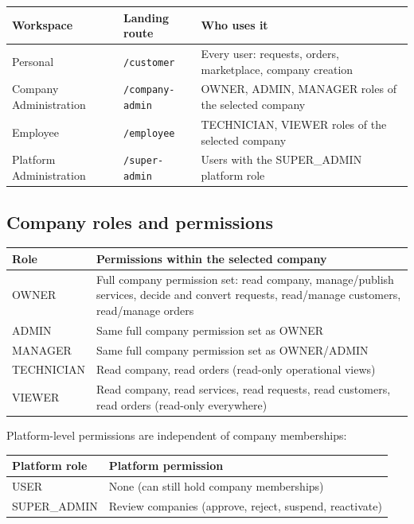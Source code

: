 \documentclass[11pt,a4paper]{article}
\begin{document}
\begin{longtable}{@{}L{3.6cm}L{3.6cm}L{7.6cm}@{}}
  \toprule
  \textbf{Workspace} & \textbf{Landing route} & \textbf{Who uses it} \\
  \midrule
  \endhead
  Personal & \texttt{/customer} & Every user: requests, orders, marketplace, company creation \\
  Company Administration & \texttt{/company-admin} & OWNER, ADMIN, MANAGER roles of the selected company \\
  Employee & \texttt{/employee} & TECHNICIAN, VIEWER roles of the selected company \\
  Platform Administration & \texttt{/super-admin} & Users with the SUPER\_ADMIN platform role \\
  \bottomrule
\end{longtable}

\subsection{Company roles and permissions}
\label{sec:permissions}

\begin{longtable}{@{}L{3.2cm}L{11.2cm}@{}}
  \toprule
  \textbf{Role} & \textbf{Permissions within the selected company} \\
  \midrule
  \endhead
  OWNER & Full company permission set: read company, manage/publish services, decide and convert requests, read/manage customers, read/manage orders \\
  ADMIN & Same full company permission set as OWNER \\
  MANAGER & Same full company permission set as OWNER/ADMIN \\
  TECHNICIAN & Read company, read orders (read-only operational views) \\
  VIEWER & Read company, read services, read requests, read customers, read orders (read-only everywhere) \\
  \bottomrule
\end{longtable}

Platform-level permissions are independent of company memberships:

\begin{longtable}{@{}L{4cm}L{10.4cm}@{}}
  \toprule
  \textbf{Platform role} & \textbf{Platform permission} \\
  \midrule
  \endhead
  USER & None (can still hold company memberships) \\
  SUPER\_ADMIN & Review companies (approve, reject, suspend, reactivate) \\
  \bottomrule
\end{longtable}
\end{document}
